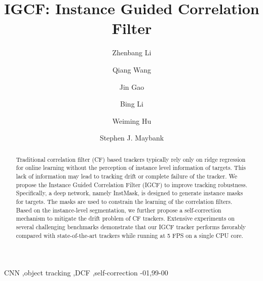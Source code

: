 \documentclass[review]{elsarticle}
\begin{document}
\begin{frontmatter}

\title{IGCF: Instance Guided Correlation Filter}

\author[address1,address3]{Zhenbang Li}
\author[address1,address3]{Qiang Wang}
\author[address1]{Jin Gao}
\author[address1]{Bing Li}
\author[address1,address2,address3]{Weiming Hu}
\author[address4]{Stephen J. Maybank}
\address[address1]{National Laboratory of Pattern Recognition, Institute of Automation, Chinese Academy of Sciences, Beijing 100190, PR China}
\address[address2]{CAS Center for Excellence in Brain Science and Intelligence Technology, Chinese Academy of Sciences, Beijing 100190, PR China}
\address[address3]{University of Chinese Academy of Sciences, Beijing 100190, PR China}
\address[address4]{Department of Computer Science and Information Systems, Birkbeck College, London WC1E 7HX, United Kingdom}

\begin{abstract}
Traditional correlation filter (CF) based trackers typically rely only on ridge regression for online learning without the perception of instance level information of targets. This lack of information may lead to tracking drift or complete failure of the tracker. We propose the Instance Guided Correlation Filter (IGCF) to improve tracking robustness. Specifically, a deep network, namely InstMask, is designed to generate instance masks for targets. The masks are used to constrain the learning of the correlation filters. Based on the instance-level segmentation, we further propose a self-correction mechanism to mitigate the drift problem of CF trackers. Extensive experiments on several challenging benchmarks demonstrate that our IGCF tracker performs favorably compared with state-of-the-art trackers while running at 5 FPS on a single CPU core.
\end{abstract}

\begin{keyword}
CNN \sep object tracking \sep DCF \sep self-correction
-01\sep  99-00
\end{keyword}

\end{frontmatter}

\linenumbers
\end{document}

